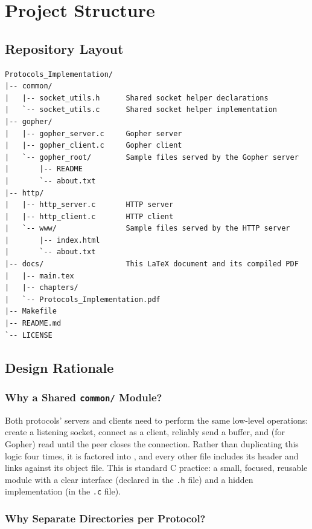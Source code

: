 \chapter{Project Structure}
\label{chap:project-structure}

\section{Repository Layout}

\begin{lstlisting}[style=bashstyle, numbers=none]
Protocols_Implementation/
|-- common/
|   |-- socket_utils.h      Shared socket helper declarations
|   `-- socket_utils.c      Shared socket helper implementation
|-- gopher/
|   |-- gopher_server.c     Gopher server
|   |-- gopher_client.c     Gopher client
|   `-- gopher_root/        Sample files served by the Gopher server
|       |-- README
|       `-- about.txt
|-- http/
|   |-- http_server.c       HTTP server
|   |-- http_client.c       HTTP client
|   `-- www/                Sample files served by the HTTP server
|       |-- index.html
|       `-- about.txt
|-- docs/                   This LaTeX document and its compiled PDF
|   |-- main.tex
|   |-- chapters/
|   `-- Protocols_Implementation.pdf
|-- Makefile
|-- README.md
`-- LICENSE
\end{lstlisting}

\section{Design Rationale}

\subsection{Why a Shared \texttt{common/} Module?}

Both protocols' servers and clients need to perform the same low-level operations: create a listening socket, connect as a client, reliably send a buffer, and (for Gopher) read until the peer closes the connection. Rather than duplicating this logic four times, it is factored into , and every other file includes its header and links against its object file. This is standard C practice: a small, focused, reusable module with a clear interface (declared in the \texttt{.h} file) and a hidden implementation (in the \texttt{.c} file).

\subsection{Why Separate Directories per Protocol?}

